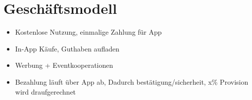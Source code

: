 
\section{Geschäftsmodell}
\begin{itemize}
   \item Kostenlose Nutzung, einmalige Zahlung für App

   \item In-App Käufe, Guthaben aufladen

   \item Werbung + Eventkooperationen

   \item Bezahlung läuft über App ab, Dadurch bestätigung/sicherheit, x\% Provision wird draufgerechnet


\end{itemize}
 